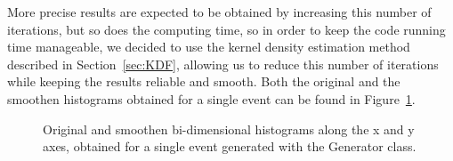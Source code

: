 \documentclass[a4paper, 11pt]{report}
\begin{document}
More precise results are expected to be obtained by increasing this number of iterations, but so does the computing time, so in order to keep the code running time manageable, we decided to use the kernel density estimation method described in Section~\ref{sec:KDF}, allowing us to reduce this number of iterations while keeping the results reliable and smooth. Both the original and the smoothen histograms obtained for a single event can be found in Figure~\ref{fig:KDFresults}.

\begin{figure}[htbp]
\begin{center}
\caption{Original and smoothen bi-dimensional histograms along the x and y axes, obtained for a single event generated with the Generator class.}
\label{fig:KDFresults}
\end{center}
\end{figure}
\end{document}
